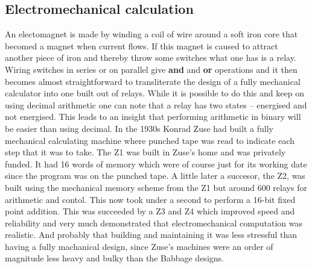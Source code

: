 \subsection{Electromechanical calculation}
An electomagnet is made by winding a coil of wire around a soft iron core
that becomed a magnet when current flows. If this magnet is caused to
attract another piece of iron and thereby throw some switches what one has
is a relay. Wiring switches in series or on parallel give \textbf{and} and
\textbf{or} operations and it then becomes almost straightforward to
transliterate the design of a fully mechanical calculator into one
built out of relays. While it is possible to do this and keep on using
decimal arithmetic one can note that a relay has two states -- energised and
not energised. This leads to an insight that performing arithmetic in binary
will be easier than using decimal. In the 1930s Konrad Zuse\cite{zuse} had
built a fully mechanical calculating machine where punched tape was read to
indicate each step that it was to take. The Z1 was built in Zuse's home
and was privately funded. It had 16 words of memory which were of course
just for its working date since the program was on the punched tape.
A little later a succesor, the Z2, was built using the mechanical
memory scheme from the Z1 but around 600 relays for arithmetic and
contol. This now took under a second to perform a 16-bit fixed point
addition. This was succeeded by a Z3 and Z4 which improved speed and
reliability and very much demonstrated that electromechanical computation
was realistic. And probably that building and maintaining it was less
stressful than having a fully machanical design, since Zuse's machines
were an order of magnitude less heavy and bulky than the Babbage designs.
